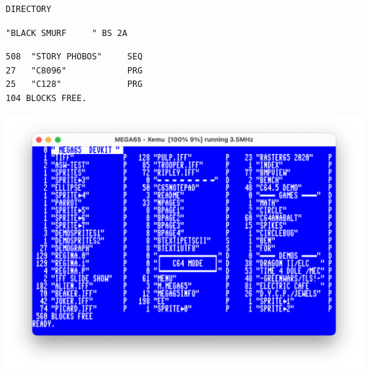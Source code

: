 \begin{description}[leftmargin=2cm,style=nextline]
\begin{tcolorbox}[colback=black,coltext=white]
\verbatimfont{\codefont}
\begin{verbatim}
DIRECTORY
\end{verbatim}
\selectfont{\codefont 0}
\begin{tcolorbox}[colback=white,coltext=black,arc=0mm,boxrule=0mm,
       left*=0.5mm,right*=0mm,top=0mm,bottom=0mm,nobeforeafter,
       left skip=0.5mm,
       width=28mm,height=3mm,valign=center]
\begin{verbatim}
"BLACK SMURF     " BS 2A
\end{verbatim}
\end{tcolorbox}
\begin{verbatim}
508  "STORY PHOBOS"     SEQ
27   "C8096"            PRG
25   "C128"             PRG
104 BLOCKS FREE.
\end{verbatim}
\end{tcolorbox}

\includegraphics[width=\linewidth]{images/directory.png}

\end{description}


\newpage

